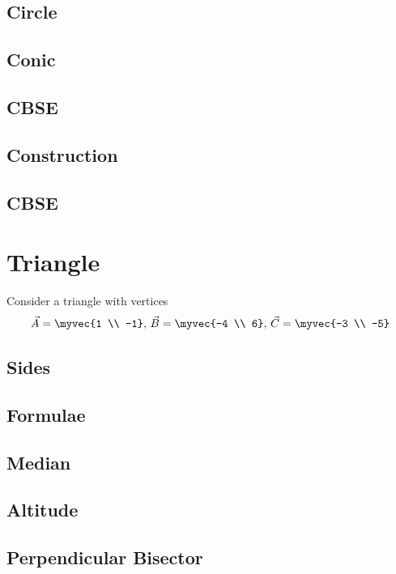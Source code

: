\documentclass[journal]{IEEEtran}
\begin{document}
\subsection{Circle}

\subsection{Conic}

\subsection{CBSE}

\subsection{Construction}

\subsection{CBSE}

%
\appendices
\section{Triangle}
Consider a triangle with vertices
		\begin{align}
			\label{eq:app-tri-pts}
			\vec{A} = \myvec{1 \\ -1},\,
			\vec{B} = \myvec{-4 \\ 6},\,
			\vec{C} = \myvec{-3 \\ -5}
		\end{align}
\subsection{Sides}

\subsection{Formulae}

\subsection{Median}

\subsection{Altitude}

\subsection{Perpendicular Bisector}

\end{document}
